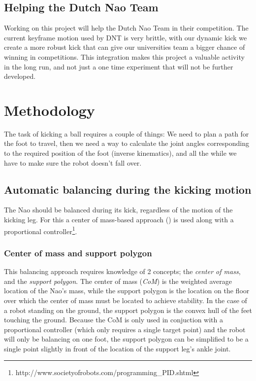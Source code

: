 \documentclass[a4paper]{article}
\begin{document}
\subsection{Helping the Dutch Nao Team}
 Working on this project will help the Dutch Nao Team in their competition. The
current keyframe motion used by DNT is very brittle, with our dynamic kick we
create a
more robust kick that can give our universities team a bigger chance of
winning in competitions. 
This integration makes this project a valuable activity in the long run, and not
just a one time experiment that will not be further developed.

\section{Methodology}
The task of kicking a ball requires a couple of things: We need to plan a path
for the foot to travel, then we need a way to calculate the joint angles
corresponding to the required position of the foot (inverse kinematics), and all
the while we have to make sure the robot doesn't fall over.

\subsection{Automatic balancing during the kicking motion}
The Nao should be balanced during its kick, regardless of the motion of the
kicking leg. For this a center of mass-based approach (\cite{Xu2010}) is used
along with a proportional
controller\footnote{http://www.societyofrobots.com/programming\_PID.shtml}.

\subsubsection{Center of mass and support polygon}
This balancing approach requires knowledge of 2 concepts; the \emph{center of mass},
and the \emph{support polygon}. The center of mass (\emph{CoM}) is the weighted average
location of the Nao's mass, while the support polygon is the location on the
floor over which the center of mass must be located to achieve stability. In the
case of a robot standing on the ground, the support polygon is the convex hull
of the feet touching the ground. Because the CoM is only used in conjuction with
a proportional controller (which only requires a single target point) and the
robot will only be balancing on one foot, the support polygon can be simplified
to be a single point slightly in front of the location of the support leg's ankle
joint.
\end{document}
